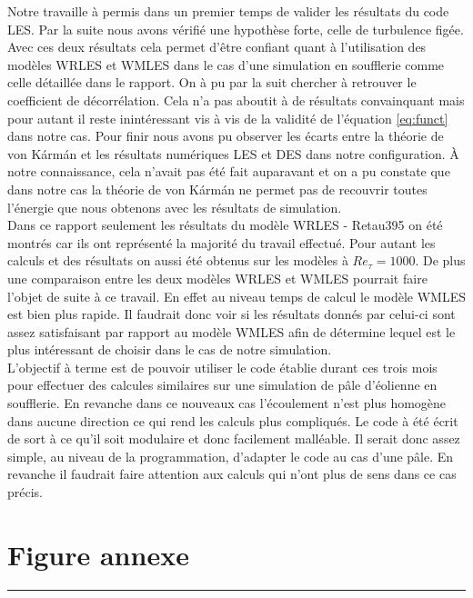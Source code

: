 \documentclass[12pt]{article}
\theoremstyle{plain}
\theoremstyle{remark}
\begin{document}
Notre travaille à permis dans un premier temps de valider les résultats du code LES. Par la suite nous avons vérifié une hypothèse forte, celle de turbulence figée. Avec ces deux résultats cela permet d'être confiant quant à l'utilisation des modèles WRLES et WMLES dans le cas d'une simulation en soufflerie comme celle détaillée dans le rapport. On à pu par la suit chercher à retrouver le coefficient de décorrélation. Cela n'a pas aboutit à de résultats convainquant mais pour autant il reste inintéressant vis à vis de la validité de l'équation \ref{eq:funct} dans notre cas. Pour finir nous avons pu observer les écarts entre la théorie de von Kármán et les résultats numériques LES et DES dans notre configuration. À notre connaissance, cela n'avait pas été fait auparavant et on a pu constate que dans notre cas la théorie de von Kármán ne permet pas de recouvrir toutes l'énergie que nous obtenons avec les résultats de simulation. \\ 
Dans ce rapport seulement les résultats du modèle WRLES - Retau395 on été montrés car ils ont représenté la majorité du travail effectué. Pour autant les calculs et des résultats on aussi été obtenus sur les modèles à $Re_{\tau}=1000$. De plus une comparaison entre les deux modèles WRLES et WMLES pourrait faire l'objet de suite à ce travail. En effet au niveau temps de calcul le modèle WMLES est bien plus rapide. Il faudrait donc voir si les résultats donnés par celui-ci sont assez satisfaisant par rapport au modèle WMLES afin de détermine lequel est le plus intéressant de choisir dans le cas de notre simulation. \\
L'objectif à terme est de pouvoir utiliser le code établie durant ces trois mois pour effectuer des calcules similaires sur une simulation de pâle d'éolienne en soufflerie. En revanche dans ce nouveaux cas l'écoulement n'est plus homogène dans aucune direction ce qui rend les calculs plus compliqués. Le code à été écrit de sort à ce qu'il soit modulaire et donc facilement malléable. Il serait donc assez simple, au niveau de la programmation, d'adapter le code au cas d'une pâle. En revanche il faudrait faire attention aux calculs qui n'ont plus de sens dans ce cas précis.

\pagebreak


\section{Figure annexe}
\noindent\rule{\linewidth}{2pt}
\vspace{0.1cm}
\end{document}
